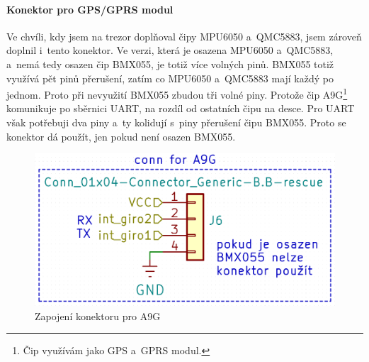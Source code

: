 \paragraph{Konektor pro GPS/GPRS modul}
\label{A9}
Ve chvíli, kdy jsem na trezor do\-pl\-ňo\-val čipy MPU6050 a~QMC5883, jsem zároveň doplnil i~tento konektor. 
Ve verzi, která je osazena MPU6050 a~QMC5883, a~nemá tedy osazen čip BMX055, 
je totiž více volných pinů. BMX055 totiž využívá pět pinů přerušení, zatím co MPU6050 a~QMC5883 mají každý po jednom. 
Proto při nevyužití BMX055 zbudou tři volné piny.
Protože čip A9G\footnote{Čip využívám jako GPS a~GPRS modul.} komunikuje po sběrnici UART, na rozdíl od ostatních čipu na desce. 
Pro UART však potřebuji
dva piny a~ty kolidují s~piny přerušení čipu BMX055. Proto se konektor dá použít, jen pokud není osazen BMX055.

\begin{figure}[h]
    \centering
    \includegraphics[width=\textwidth]{kapitoly/obrazky/E4/vnimani/conn-A9G.png}
    \caption{Zapojení konektoru pro A9G}
    \label{fig:E4-A9G}
\end{figure}


